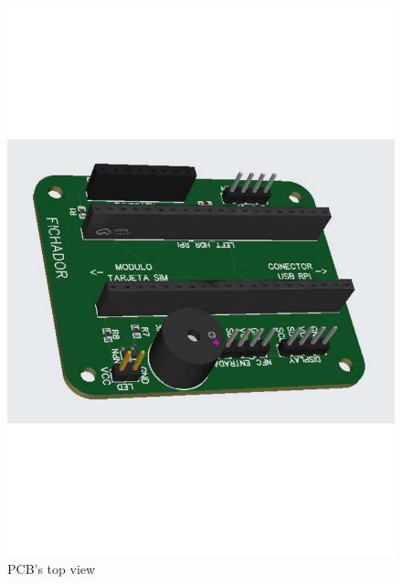 \begin{figure}[h]
    \centering
    \begin{minipage}[b]{0.45\textwidth}
        \centering
        \includegraphics[width=.9\textwidth]{Imagenes/Vectorial/pcb1.pdf}
        \caption{PCB's top view}
        \label{fig:pcb_topview}
    \end{minipage}
    \hfill
    \begin{minipage}[b]{0.45\textwidth}
        \centering

\end{minipage}
\end{figure}

